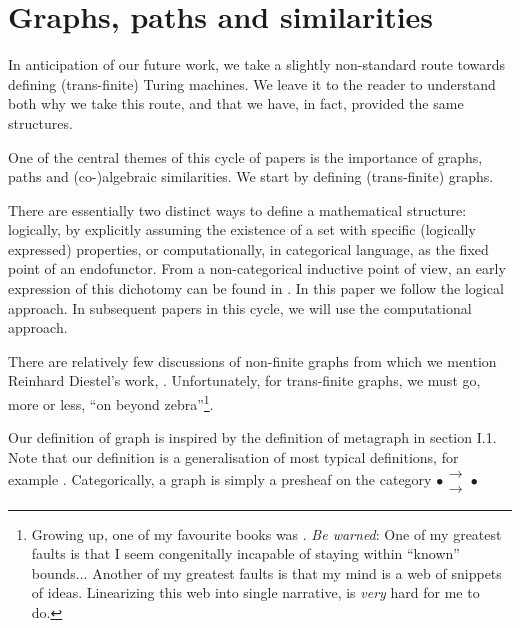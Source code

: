 \documentclass[a4paper,openany]{amsart}
\begin{document}
\section{Graphs, paths and similarities}

In anticipation of our future work, we take a slightly non-standard route towards defining
(trans-finite) Turing machines. We leave it to the reader to understand both why we take
this route, and that we have, in fact, provided the same structures.

One of the central themes of this cycle of papers is the importance of graphs, paths and
(co-)algebraic similarities. We start by defining (trans-finite) graphs.

There are essentially two distinct ways to define a mathematical structure: logically, by
explicitly assuming the existence of a set with specific (logically expressed) properties,
or computationally, in categorical language, as the fixed point of an endofunctor. From a
non-categorical inductive point of view, an early expression of this dichotomy can be
found in \cite[page 1]{moschovakis1974induction}. In this paper we follow the logical
approach. In subsequent papers in this cycle, we will use the computational approach.

There are relatively few discussions of non-finite graphs from which we mention Reinhard
Diestel's work, \cite{diestel2006graphTheory, diestel1990infiniteGraphTheory}.
Unfortunately, for trans-finite graphs, we must go, more or less, ``on beyond
zebra''\footnote{Growing up, one of my favourite books was \cite{seuss1955onBeyondZebra}.
\emph{Be warned}: One of my greatest faults is that I seem congenitally incapable of
staying within ``known'' bounds... Another of my greatest faults is that my mind is a web
of snippets of ideas. Linearizing this web into single narrative, is \emph{very} hard for
me to do.}.

Our definition of graph is inspired by the definition of metagraph in
\cite{macLane1971categoriesWorkingMathematician} section I.1. Note that our definition is
a generalisation of most typical definitions, for example \cite[section
1.1]{diestel2006graphTheory}. Categorically, a graph is simply a presheaf on the category
$ \bullet \substack{\mathbf{\longrightarrow} \\[-0.7ex] \mathbf{\longrightarrow}} \bullet $
\end{document}
